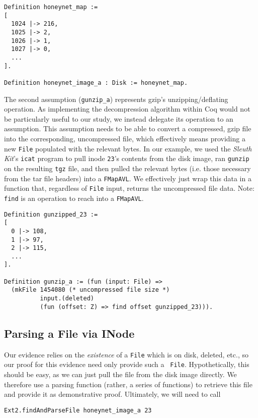 \documentclass[nocopyrightspace]{sigplanconf}
\begin{document}
\begin{lstlisting}
Definition honeynet_map := 
[ 
  1024 |-> 216, 
  1025 |-> 2,
  1026 |-> 1, 
  1027 |-> 0, 
  ...
].

Definition honeynet_image_a : Disk := honeynet_map.
\end{lstlisting}

The second assumption ({\tt gunzip\_a}) represents gzip's unzipping/deflating
operation. As implementing the decompression algorithm within Coq would not be
particularly useful to our study, we instead delegate its operation to an
assumption. This assumption needs to be able to convert a compressed, gzip
file into the corresponding, uncompressed file, which effectively means
providing a new {\tt File} populated with the relevant bytes. In our example,
we used the {\it Sleuth Kit}'s {\tt icat} program to pull inode {\tt 23}'s
contents from the disk image, ran {\tt gunzip} on the resulting {\tt tgz}
file, and then pulled the relevant bytes (i.e. those necessary from the tar
file headers) into a {\tt FMapAVL}. We effectively just wrap this data in a
function that, regardless of {\tt File} input, returns the uncompressed file
data. Note: {\tt find} is an operation to reach into a {\tt FMapAVL}.

\begin{lstlisting}
Definition gunzipped_23 := 
[ 
  0 |-> 108, 
  1 |-> 97, 
  2 |-> 115, 
  ...
].

Definition gunzip_a := (fun (input: File) => 
  (mkFile 1454080 (* uncompressed file size *)
          input.(deleted) 
          (fun (offset: Z) => find offset gunzipped_23))).
\end{lstlisting}

\subsection{Parsing a File via INode}

Our evidence relies on the {\it existence} of a {\tt File} which is on disk,
deleted, etc., so our proof for this evidence need only provide such a {\tt
File}. Hypothetically, this should be easy, as we can just pull the file from
the disk image directly. We therefore use a parsing function (rather, a series
of functions) to retrieve this file and provide it as demonstrative proof.
Ultimately, we will need to call

\begin{lstlisting}
Ext2.findAndParseFile honeynet_image_a 23
\end{lstlisting}
\end{document}
